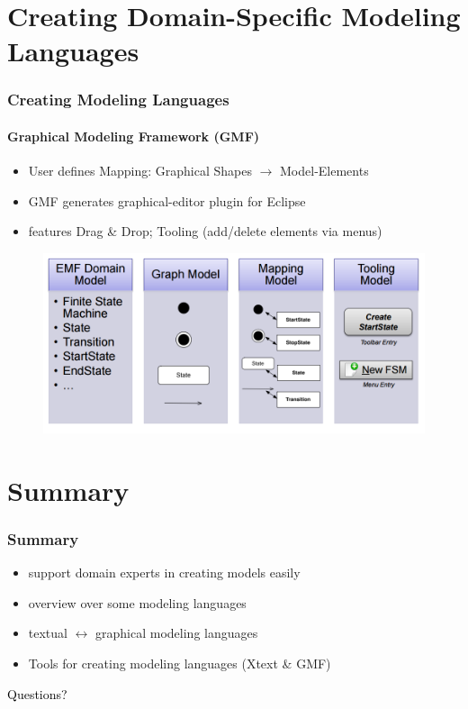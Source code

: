 \documentclass[11 pt,t]{beamer}
\begin{document}
\section{Creating Domain-Specific Modeling Languages}
\begin{frame}
\vspace{.5cm}
  \frametitle{Creating Modeling Languages}
  \framesubtitle{Graphical Modeling Framework (GMF)}
  \begin{itemize}
    \item User defines Mapping: Graphical Shapes $\rightarrow$ Model-Elements
    \item GMF generates graphical-editor plugin for Eclipse 
    \item features Drag \& Drop; Tooling (add/delete elements via menus)
  \end{itemize}
  \begin{figure}[htbp]
      \centering
      \includegraphics[width=\textwidth]{images/TableGMFSteps.PNG}
      \label{mapmodel}
    \end{figure}
\end{frame}

\section{Summary}
\begin{frame}
  \vspace{2cm}
  \frametitle{Summary}
  \begin{itemize}
    \item support domain experts in creating models easily 
    \item overview over some modeling languages
    \item textual $\leftrightarrow$ graphical modeling languages
    \item Tools for creating modeling languages (Xtext \& GMF)
  \end{itemize}
\end{frame}

\appendix
\begin{frame}
\vspace{4cm}
\centering \Large \textcolor{black}{Questions?}

\end{frame}
\end{document}

